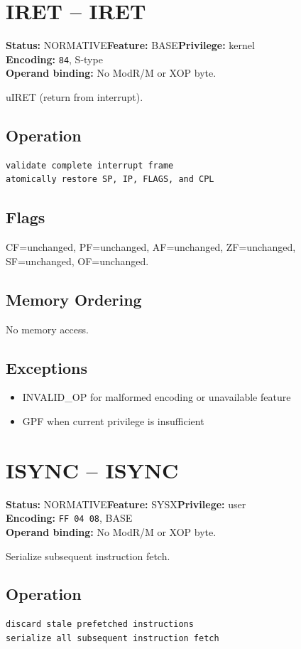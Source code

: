 \documentclass[10pt]{article}
\begin{document}
\section{IRET -- IRET}
\textbf{Status:} NORMATIVE\quad \textbf{Feature:} BASE\quad \textbf{Privilege:} kernel\\
\textbf{Encoding:} \texttt{84}, S-type\\
\textbf{Operand binding:} No ModR/M or XOP byte.

uIRET (return from interrupt).

\subsection*{Operation}
\begin{lstlisting}
validate complete interrupt frame
atomically restore SP, IP, FLAGS, and CPL
\end{lstlisting}
\subsection*{Flags}
CF=unchanged, PF=unchanged, AF=unchanged, ZF=unchanged, SF=unchanged, OF=unchanged.
\subsection*{Memory Ordering}
No memory access.
\subsection*{Exceptions}
\begin{itemize}
\item INVALID\_OP for malformed encoding or unavailable feature
\item GPF when current privilege is insufficient
\end{itemize}
\clearpage

\section{ISYNC -- ISYNC}
\textbf{Status:} NORMATIVE\quad \textbf{Feature:} SYSX\quad \textbf{Privilege:} user\\
\textbf{Encoding:} \texttt{FF 04 08}, BASE\\
\textbf{Operand binding:} No ModR/M or XOP byte.

Serialize subsequent instruction fetch.

\subsection*{Operation}
\begin{lstlisting}
discard stale prefetched instructions
serialize all subsequent instruction fetch
\end{lstlisting}
\end{document}
